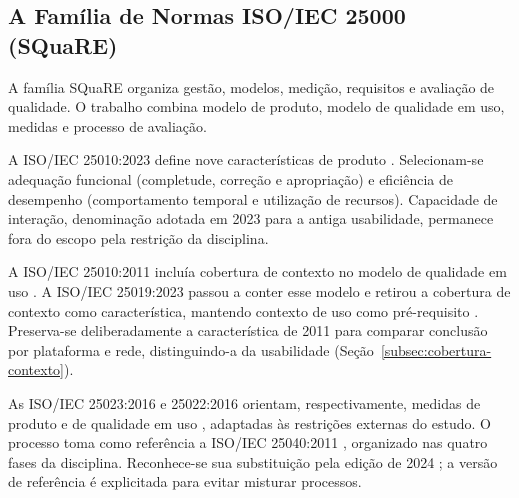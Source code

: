 \subsection{A Família de Normas ISO/IEC 25000 (SQuaRE)}
\label{sec:referencial-square}

A família SQuaRE organiza gestão, modelos, medição, requisitos e avaliação de qualidade. O trabalho combina modelo de produto, modelo de qualidade em uso, medidas e processo de avaliação.

A ISO/IEC 25010:2023 define nove características de produto \cite{iso25010_2023}. Selecionam-se adequação funcional (completude, correção e apropriação) e eficiência de desempenho (comportamento temporal e utilização de recursos). Capacidade de interação, denominação adotada em 2023 para a antiga usabilidade, permanece fora do escopo pela restrição da disciplina.

A ISO/IEC 25010:2011 incluía cobertura de contexto no modelo de qualidade em uso \cite{iso25010_2011}. A ISO/IEC 25019:2023 passou a conter esse modelo e retirou a cobertura de contexto como característica, mantendo contexto de uso como pré-requisito \cite{iso25019_2023}. Preserva-se deliberadamente a característica de 2011 para comparar conclusão por plataforma e rede, distinguindo-a da usabilidade (Seção~\ref{subsec:cobertura-contexto}).

As ISO/IEC 25023:2016 e 25022:2016 orientam, respectivamente, medidas de produto e de qualidade em uso \cite{iso25023_2016,iso25022_2016}, adaptadas às restrições externas do estudo. O processo toma como referência a ISO/IEC 25040:2011 \cite{iso25040_2011}, organizado nas quatro fases da disciplina. Reconhece-se sua substituição pela edição de 2024 \cite{iso25040_2024}; a versão de referência é explicitada para evitar misturar processos.
